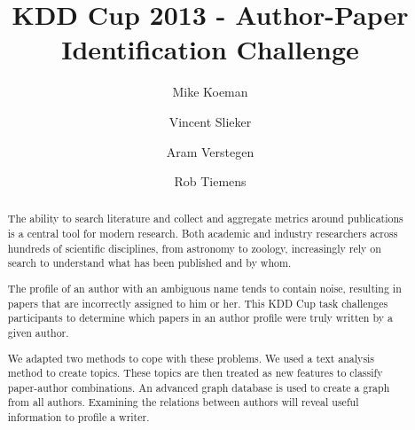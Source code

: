\documentclass[10pt,a4paper]{article}
\title{KDD Cup 2013 - Author-Paper Identification Challenge}
\author{ Mike Koeman \and Vincent Slieker   \and Aram Verstegen \and Rob Tiemens}
\begin{document}
\maketitle


\begin{abstract}
The ability to search literature and collect and aggregate metrics around publications is a central tool for modern research. Both academic and industry researchers across hundreds of scientific disciplines, from astronomy to zoology, increasingly rely on search to understand what has been published and by whom.

The profile of an author with an ambiguous name tends to contain noise, resulting in papers that are incorrectly assigned to him or her. This KDD Cup task challenges participants to determine which papers in an author profile were truly written by a given author.

We adapted two methods to cope with these problems. We used a text analysis method to create topics. These topics are then treated as new features to classify paper-author combinations. An advanced graph database is used to create a graph from all authors. Examining the relations between authors will reveal useful information to profile a writer.
\end{abstract}

\nocite{chowdhury2010introduction}
\nocite{liu2005co}
\nocite{glanzel2005analysing}
\nocite{morel2009co}
\nocite{niels2008writer}
\nocite{steyvers2004probabilistic}
\nocite{newman2004coauthorship}
\nocite{Liu:2006:WDM:1215470}
\nocite{Witten:2005:DMP:1205860}















\end{document}
